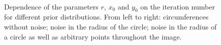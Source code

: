 \begin{figure}[h]
	\\

\caption{Dependence of the parameters  $r$, $x_0$ and $y_0$ on the iteration number for different prior distributions. From left to right: circumferences without noise; noise in the radius of the circle; noise in the radius of a circle as well as arbitrary points throughout the image.}
\label{ce:fig4}
\end{figure}

